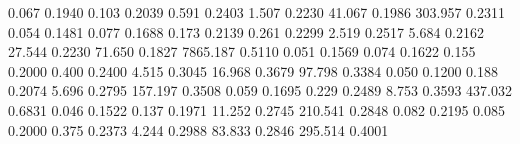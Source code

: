 0.067     0.1940  %
0.103     0.2039  %
0.591     0.2403  %
1.507     0.2230  %
41.067    0.1986  %
303.957   0.2311  %
0.054     0.1481  %
0.077     0.1688  %
0.173     0.2139  %
0.261     0.2299  %
2.519     0.2517  %
5.684     0.2162  %
27.544    0.2230  %
71.650    0.1827  %
7865.187  0.5110  %
0.051     0.1569  %
0.074     0.1622  %
0.155     0.2000  %
0.400     0.2400  %
4.515     0.3045  %
16.968    0.3679  %
97.798    0.3384  %
0.050     0.1200  %
0.188     0.2074  %
5.696     0.2795  %
157.197   0.3508  %
0.059     0.1695  %
0.229     0.2489  %
8.753     0.3593  %
437.032   0.6831  %
0.046     0.1522  %
0.137     0.1971  %
11.252    0.2745  %
210.541   0.2848  %
0.082     0.2195  %
0.085     0.2000  %
0.375     0.2373  %
4.244     0.2988  %
83.833    0.2846  %
295.514   0.4001  %
